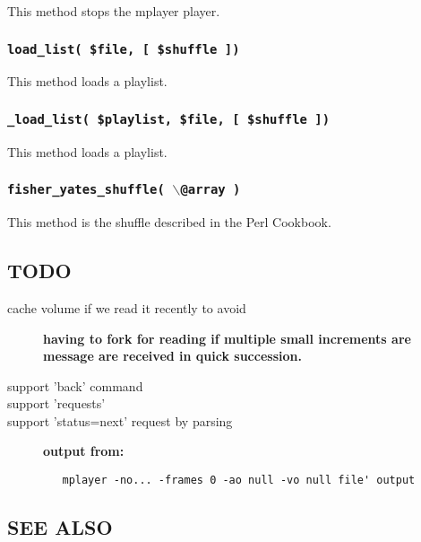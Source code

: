 \documentclass[12pt,a4paper]{article}
\begin{document}
This method stops the mplayer player.

\subsubsection*{\texttt{load\_list( \$file, [ \$shuffle ])}\label{xpl-mplayer_load_list_file_shuffle_}}


This method loads a playlist.

\subsubsection*{\texttt{\_load\_list( \$playlist, \$file, [ \$shuffle ])}\label{xpl-mplayer__load_list_playlist_file_shuffle_}}


This method loads a playlist.

\subsubsection*{\texttt{fisher\_yates\_shuffle( $\backslash$@array )}\label{xpl-mplayer_fisher_yates_shuffle_backslash_array_}}


This method is the shuffle described in the Perl Cookbook.

\subsection*{TODO\label{xpl-mplayer_TODO}}
\begin{description}

\item[{cache volume if we read it recently to avoid}] \textbf{having to fork for reading if multiple small increments are message are received in quick succession.}
\item[{support 'back' command}] \mbox{}
\item[{support 'requests'}] \mbox{}
\item[{support 'status=next' request by parsing}] \textbf{output from:}\begin{verbatim}
   mplayer -no... -frames 0 -ao null -vo null file' output
\end{verbatim}
\end{description}
\subsection*{SEE ALSO\label{xpl-mplayer_SEE_ALSO}}
\end{document}
